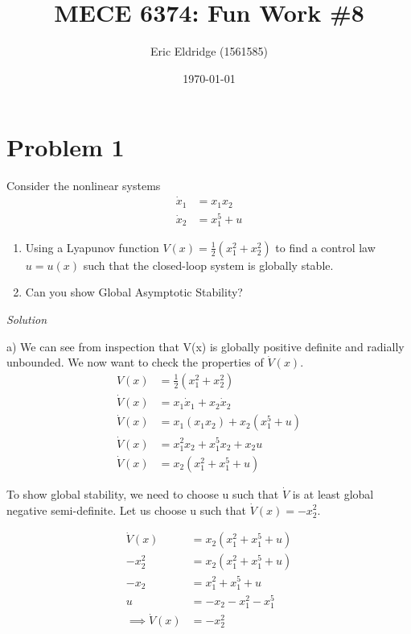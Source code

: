\documentclass{article}
\title{MECE 6374: Fun Work \#8}
\date{\today}
\author{Eric Eldridge (1561585)}
\begin{document}

  \maketitle

  \section{Problem 1}

  Consider the nonlinear systems 
  \begin{align*}
    \dot{x}_1 &= x_1x_2 \\
    \dot{x}_2 &= x_1^5 + u
  \end{align*}
  
  \begin{enumerate}[label=(\alph*)]
    \item Using a Lyapunov function $V(x)=\frac{1}{2}(x_1^2+x_2^2)$ to find a
      control law $u=u(x)$ such that the closed-loop system is globally stable.
    \item Can you show Global Asymptotic Stability?
  \end{enumerate}

  \noindent \textit{Solution} \newline \newline

  a) We can see from inspection that V(x) is globally positive definite and
  radially unbounded. We now want to check the properties of $\dot{V}(x)$. 
  \begin{align*}
    V(x) &= \frac{1}{2}(x_1^2+x_2^2) \\
    \dot{V}(x) &= x_1\dot{x}_1 + x_2\dot{x}_2 \\
    \dot{V}(x) &= x_1(x_1x_2) + x_2(x_1^5 + u) \\
    \dot{V}(x) &= x_1^2x_2 + x_1^5x_2 + x_2u \\
    \dot{V}(x) &= x_2(x_1^2 + x_1^5 + u)
  \end{align*}

  To show global stability, we need to choose u such that $\dot{V}$ is at least
  global negative semi-definite. Let us choose u such that $\dot{V}(x) =
  -x_2^2$.

  \begin{align*}
    \dot{V}(x) &= x_2(x_1^2 + x_1^5 + u) \\
    -x_2^2 &= x_2(x_1^2 + x_1^5 + u) \\
    -x_2 &= x_1^2 + x_1^5 + u \\
    u &= -x_2 - x_1^2 - x_1^5 \\
    \implies \dot{V}(x) &= -x_2^2
  \end{align*}
\end{document}

